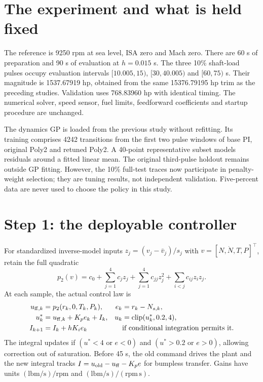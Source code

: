 \documentclass[11pt,a4paper]{article}
\begin{document}
\section{The experiment and what is held fixed}
The reference is 9250 rpm at sea level, ISA zero and Mach zero. There are 60 s of preparation and 90 s of evaluation at $h=0.015$ s. The three 10\% shaft-load pulses occupy evaluation intervals $[10.005,15)$, $[30,40.005)$ and $[60,75)$ s. Their magnitude is 1537.67919 hp, obtained from the same 15376.79195 hp trim as the preceding studies. Validation uses 768.83960 hp with identical timing. The numerical solver, speed sensor, fuel limits, feedforward coefficients and startup procedure are unchanged.

The dynamics GP is loaded from the previous study without refitting. Its training comprises 4242 transitions from the first two pulse windows of base PI, original Poly2 and retuned Poly2. A 40-point representative subset models residuals around a fitted linear mean. The original third-pulse holdout remains outside GP fitting. However, the 10\% full-test traces now participate in penalty-weight selection; they are tuning results, not independent validation. Five-percent data are never used to choose the policy in this study.

\section{Step 1: the deployable controller}
For standardized inverse-model inputs $z_j=(v_j-\bar v_j)/s_j$ with $v=[N,\dot N,T,P]^\top$, retain the full quadratic
\begin{equation}
p_2(v)=c_0+\sum_{j=1}^4c_jz_j+\sum_{j=1}^4c_{jj}z_j^2+\sum_{i<j}c_{ij}z_iz_j.
\end{equation}
At each sample, the actual control law is
\begin{align}
u_{{\rm ff},k}&=p_2(r_k,0,T_k,P_k),& e_k&=r_k-N_{s,k},\\
u_k^*&=u_{{\rm ff},k}+K_pe_k+I_k,&u_k&=\operatorname{clip}(u_k^*,0.2,4),\\
I_{k+1}&=I_k+hK_ie_k&&\text{if conditional integration permits it.}
\end{align}
The integral updates if $(u^*<4\text{ or }e<0)$ and $(u^*>0.2\text{ or }e>0)$, allowing correction out of saturation. Before 45 s, the old command drives the plant and the new integral tracks $I=u_{\rm old}-u_{\rm ff}-K_pe$ for bumpless transfer. Gains have units $(\mathrm{lbm/s})/\mathrm{rpm}$ and $(\mathrm{lbm/s})/(\mathrm{rpm\,s})$.
\end{document}
